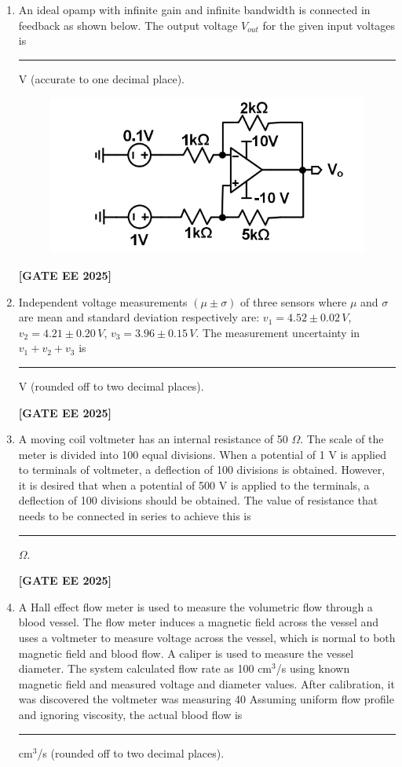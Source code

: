 \documentclass[journal]{IEEEtran}
\newcommand{\qfooter}{%
  \begin{flushright}\footnotesize\textbf{[GATE EE 2025]}\end{flushright}\vspace{1em}%
}
\begin{document}
\begin{enumerate}
\qfooter

\item An ideal opamp with infinite gain and infinite bandwidth is connected in feedback as shown below.
The output voltage \(V_{out}\) for the given input voltages is \rule{2cm}{0.15mm} V (accurate to one decimal place).

\begin{figure}[H]
    \centering
    \includegraphics[width=0.6\columnwidth]{figs/q57.png}
\end{figure}

\qfooter

\item Independent voltage measurements \((\mu \pm \sigma)\) of three sensors where \(\mu\) and \(\sigma\) are mean and standard deviation respectively are:
\(v_1 = 4.52 \pm 0.02\,V\),
\(v_2 = 4.21 \pm 0.20\,V\),
\(v_3 = 3.96 \pm 0.15\,V\).
The measurement uncertainty in \(v_1 + v_2 + v_3\) is \rule{2cm}{0.15mm} V (rounded off to two decimal places).

\qfooter

\item A moving coil voltmeter has an internal resistance of 50 \(\Omega\).
The scale of the meter is divided into 100 equal divisions.
When a potential of 1 V is applied to terminals of voltmeter, a deflection of 100 divisions is obtained.
However, it is desired that when a potential of 500 V is applied to the terminals, a deflection of 100 divisions should be obtained.
The value of resistance that needs to be connected in series to achieve this is \rule{2cm}{0.15mm} \(\Omega\).

\qfooter

\item A Hall effect flow meter is used to measure the volumetric flow through a blood vessel.
The flow meter induces a magnetic field across the vessel and uses a voltmeter to measure voltage across the vessel, which is normal to both magnetic field and blood flow.
A caliper is used to measure the vessel diameter.
The system calculated flow rate as 100 cm\(^3\)/s using known magnetic field and measured voltage and diameter values.
After calibration, it was discovered the voltmeter was measuring 40%
Assuming uniform flow profile and ignoring viscosity, the actual blood flow is \rule{2cm}{0.15mm} cm\(^3\)/s (rounded off to two decimal places).


\end{enumerate}
\end{document}
